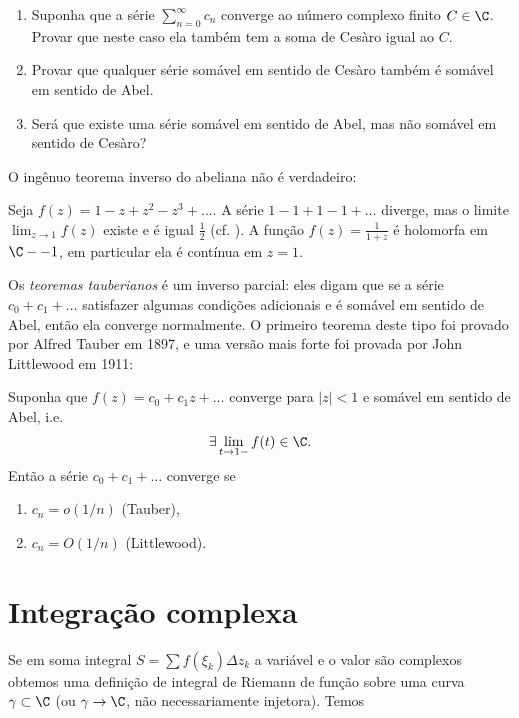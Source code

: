 \begin{problema}
\begin{enumerate}
\item Suponha que a série $\sum_{n=0}^\infty c_n$ converge ao número complexo finito $C\in \C$.
Provar que neste caso ela também tem a soma de Cesàro igual ao $C$.
\item Provar que qualquer série somável em sentido de Cesàro também é somável em sentido de Abel.
\item Será que existe uma série somável em sentido de Abel, mas não somável em sentido de Cesàro?
\end{enumerate}
\end{problema}

O ingênuo teorema inverso do  abeliana não é verdadeiro:
\begin{exem}
Seja $f(z) = 1-z+z^2-z^3+\dots$.
A série $1-1+1-1+\dots$ diverge, mas o limite $\lim_{z\to 1} f(z)$ existe e é igual $\frac12$ (cf. ).
A função $f(z) = \frac{1}{1+z}$ é holomorfa em $\C-{-1}$, em particular ela é contínua em $z=1$.
\end{exem}

Os \emph{teoremas tauberianos} é um inverso parcial: eles digam que se a série $c_0+c_1+\dots$ satisfazer algumas
condições adicionais e é somável em sentido de Abel, então ela converge normalmente.
O primeiro teorema deste tipo foi provado por Alfred Tauber em 1897, e uma versão mais forte
foi provada por John Littlewood em 1911:
\begin{teorema}
\label{t:tauber}
Suponha que $f(z) = c_0 + c_1 z + \dots$ converge para $|z|<1$
e somável em sentido de Abel, i.e.
\[ \exists \lim_{t\to1-} f(t) \in \C .\]
Então a série $c_0 + c_1 + \dots$ converge se
\begin{enumerate}
\item \label{i-tauber} $c_n = o(1/n)$ (Tauber),
\item \label{i-littlewod} $c_n = O(1/n)$ (Littlewood).
\end{enumerate}
\end{teorema}


\section{Integração complexa}

Se em soma integral $S = \sum f(\xi_k) \Delta z_k$ a variável e o valor são complexos
obtemos uma definição de integral de Riemann de função sobre uma curva $\gamma \subset \C$
(ou $\gamma \to \C$, não necessariamente injetora). Temos

